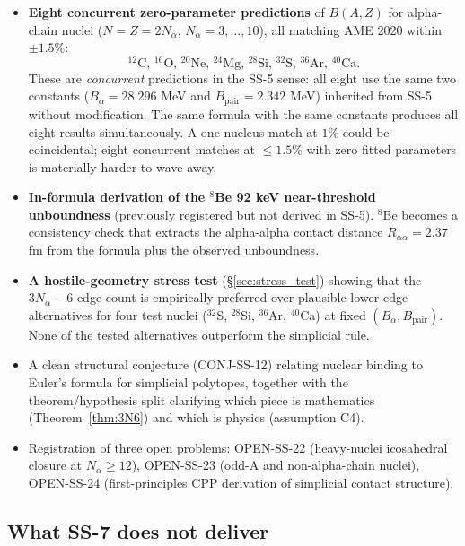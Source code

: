 \documentclass[11pt,letterpaper]{article}
\newcommand{\Bpair}{B_{\mathrm{pair}}}
\newcommand{\Balpha}{B_{\alpha}}
\newcommand{\Nalpha}{N_{\alpha}}
\newcommand{\Raa}{R_{\alpha\alpha}}
\begin{document}
\begin{itemize}
\item \textbf{Eight concurrent zero-parameter predictions} of $B(A, Z)$ for alpha-chain nuclei ($N = Z = 2\Nalpha$, $\Nalpha = 3, \ldots, 10$), all matching AME 2020 within $\pm 1.5\%$:
\[
{}^{12}\mathrm{C}, \, {}^{16}\mathrm{O}, \, {}^{20}\mathrm{Ne}, \, {}^{24}\mathrm{Mg}, \, {}^{28}\mathrm{Si}, \, {}^{32}\mathrm{S}, \, {}^{36}\mathrm{Ar}, \, {}^{40}\mathrm{Ca}.
\]
These are \emph{concurrent} predictions in the SS-5 sense: all eight use the same two constants ($\Balpha = 28.296$ MeV and $\Bpair = 2.342$ MeV) inherited from SS-5 without modification. The same formula with the same constants produces all eight results simultaneously. A one-nucleus match at $1\%$ could be coincidental; eight concurrent matches at $\leq 1.5\%$ with zero fitted parameters is materially harder to wave away.
\item \textbf{In-formula derivation of the ${}^8$Be 92 keV near-threshold unboundness} (previously registered but not derived in SS-5). ${}^8$Be becomes a consistency check that extracts the alpha-alpha contact distance $\Raa = 2.37$ fm from the formula plus the observed unboundness.
\item \textbf{A hostile-geometry stress test} (\S\ref{sec:stress_test}) showing that the $3\Nalpha - 6$ edge count is empirically preferred over plausible lower-edge alternatives for four test nuclei (${}^{32}$S, ${}^{28}$Si, ${}^{36}$Ar, ${}^{40}$Ca) at fixed $(\Balpha, \Bpair)$. None of the tested alternatives outperform the simplicial rule.
\item A clean structural conjecture (CONJ-SS-12) relating nuclear binding to Euler's formula for simplicial polytopes, together with the theorem/hypothesis split clarifying which piece is mathematics (Theorem~\ref{thm:3N6}) and which is physics (assumption C4).
\item Registration of three open problems: OPEN-SS-22 (heavy-nuclei icosahedral closure at $\Nalpha \geq 12$), OPEN-SS-23 (odd-A and non-alpha-chain nuclei), OPEN-SS-24 (first-principles CPP derivation of simplicial contact structure).
\end{itemize}

\subsection{What SS-7 does not deliver}
\end{document}
